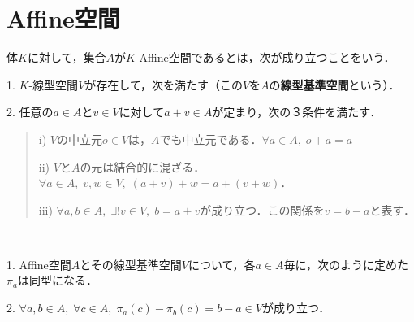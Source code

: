 \documentclass[uplatex,dvipdfmx]{jsreport}
\begin{document}
\section{Affine空間}

\begin{definition}[Affine空間]
    体$K$に対して，集合$A$が$K$-Affine空間であるとは，次が成り立つことをいう．

    1. $K$-線型空間$V$が存在して，次を満たす（この$V$を$A$の\textbf{線型基準空間}という）．

    2. 任意の$a\in A$と$v\in V$に対して$a+v\in A$が定まり，次の３条件を満たす．
    \begin{quotation}
        i) $V$の中立元$o\in V$は，$A$でも中立元である．$\forall a\in A,\; o+a=a$

        ii) $V$と$A$の元は結合的に混ざる．$\forall a\in A,\; v,w\in V,\; (a+v)+w=a+(v+w)$．

        iii) $\forall a,b\in A,\; \exists!v\in V,\; b=a+v$が成り立つ．この関係を$v=b-a$と表す．
    \end{quotation}
\end{definition}

\begin{theorem}　

    1. Affine空間$A$とその線型基準空間$V$について，各$a\in A$毎に，次のように定めた$\pi_a$は同型になる．
    \begin{center}
    \end{center}

    2. $\forall a,b\in A,\; \forall c\in A,\; \pi_a(c)-\pi_b(c)=b-a\in V$が成り立つ．
\end{theorem}
\end{document}
